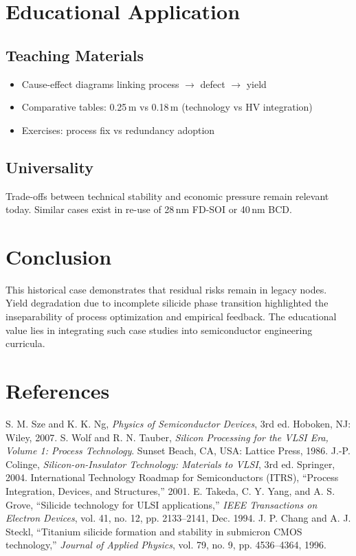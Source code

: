 \documentclass[conference]{IEEEtran}
\begin{document}
\section{Educational Application}
\subsection{Teaching Materials}
\begin{itemize}
    \item Cause-effect diagrams linking process $\rightarrow$ defect $\rightarrow$ yield
    \item Comparative tables: 0.25\,\textmu m vs 0.18\,\textmu m (technology vs HV integration)
    \item Exercises: process fix vs redundancy adoption
\end{itemize}

\subsection{Universality}
Trade-offs between technical stability and economic pressure remain relevant today. 
Similar cases exist in re-use of 28\,nm FD-SOI or 40\,nm BCD.

\section{Conclusion}
This historical case demonstrates that residual risks remain in legacy nodes. 
Yield degradation due to incomplete silicide phase transition highlighted the inseparability of process optimization and empirical feedback. 
The educational value lies in integrating such case studies into semiconductor engineering curricula.

\section*{References}
\begin{thebibliography}{99}
 S. M. Sze and K. K. Ng, \textit{Physics of Semiconductor Devices}, 3rd ed. Hoboken, NJ: Wiley, 2007.
 S. Wolf and R. N. Tauber, \textit{Silicon Processing for the VLSI Era, Volume 1: Process Technology}. Sunset Beach, CA, USA: Lattice Press, 1986.
 J.-P. Colinge, \textit{Silicon-on-Insulator Technology: Materials to VLSI}, 3rd ed. Springer, 2004.
 International Technology Roadmap for Semiconductors (ITRS), ``Process Integration, Devices, and Structures,'' 2001.
 E. Takeda, C. Y. Yang, and A. S. Grove, ``Silicide technology for ULSI applications,'' \textit{IEEE Transactions on Electron Devices}, vol. 41, no. 12, pp. 2133--2141, Dec. 1994.
 J. P. Chang and A. J. Steckl, ``Titanium silicide formation and stability in submicron CMOS technology,'' \textit{Journal of Applied Physics}, vol. 79, no. 9, pp. 4536--4364, 1996.
\end{thebibliography}
\end{document}
